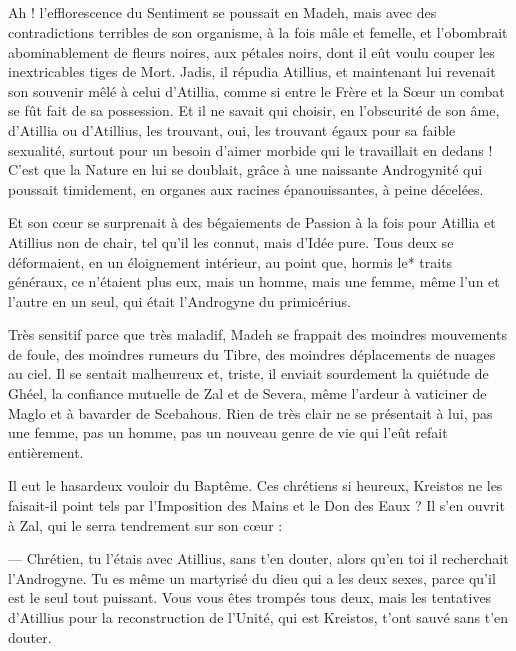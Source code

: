 \documentclass[a4paper, 11pt, oneside, polutonikogreek, french]{article}
\begin{document}
\subsection{}
\paragraph{}
Ah ! l'efflorescence du Sentiment se poussait en Madeh, mais avec des contradictions terribles de son organisme, à la fois mâle et femelle, et l'obombrait abominablement de fleurs noires, aux pétales noirs, dont il eût voulu couper les inextricables tiges de Mort. Jadis, il répudia Atillius, et maintenant lui revenait son souvenir mêlé à celui d'Atillia, comme si entre le Frère et la Sœur un combat se fût fait de sa possession. Et il ne savait qui choisir, en l'obscurité de son âme, d'Atillia ou d'Atillius, les trouvant, oui, les trouvant égaux pour sa faible sexualité, surtout pour un besoin d'aimer morbide qui le travaillait en dedans ! C'est que la Nature en lui se doublait, grâce à une naissante Androgynité qui poussait timidement, en organes aux racines épanouissantes, à peine décelées.

Et son cœur se surprenait à des bégaiements de Passion à la fois pour Atillia et Atillius non de chair, tel qu'il les connut, mais d'Idée pure. Tous deux se déformaient, en un éloignement intérieur, au point que, hormis le* traits généraux, ce n'étaient plus eux, mais un homme, mais une femme, même l'un et l'autre en un seul, qui était l'Androgyne du primicérius.

Très sensitif parce que très maladif, Madeh se frappait des moindres mouvements de foule, des moindres rumeurs du Tibre, des moindres déplacements de nuages au ciel. Il se sentait malheureux et, triste, il enviait sourdement la quiétude de Ghéel, la confiance mutuelle de Zal et de Severa, même l'ardeur à vaticiner de Maglo et à bavarder de Scebahous. Rien de très clair ne se présentait à lui, pas une femme, pas un homme, pas un nouveau genre de vie qui l'eût refait entièrement.

Il eut le hasardeux vouloir du Baptême. Ces chrétiens si heureux, Kreistos ne les faisait-il point tels par l'Imposition des Mains et le Don des Eaux ? Il s'en ouvrit à Zal, qui le serra tendrement sur son cœur :

--- Chrétien, tu l'étais avec Atillius, sans t'en douter, alors qu'en toi il recherchait l'Androgyne. Tu es même un martyrisé du dieu qui a les deux sexes, parce qu'il est le seul tout puissant. Vous vous êtes trompés tous deux, mais les tentatives d'Atillius pour la reconstruction de l'Unité, qui est Kreistos, t'ont sauvé sans t'en douter.
\end{document}
